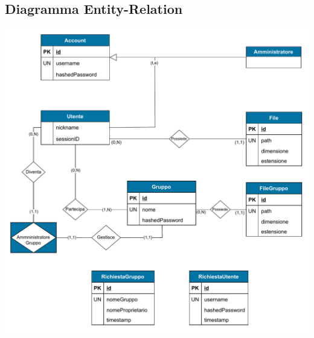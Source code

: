 \subsection*{Diagramma Entity-Relation}
{}
\vspace{0.5cm}
\begin{adjustwidth}{-2cm}{0cm}
\includegraphics[scale=0.9]{progettazione/Diagramma-Sequenza-Diagramma-ER.drawio.pdf}
\end{adjustwidth}
\vspace{0.5cm}


\vspace{1cm}
